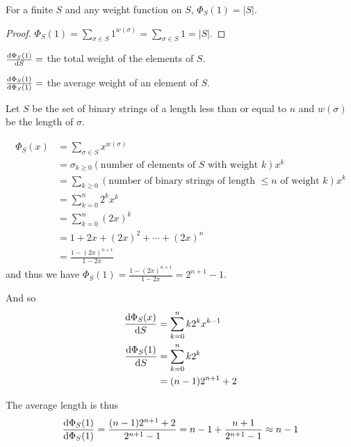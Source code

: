 \documentclass[12pt]{article}
\begin{document}
\begin{theorem}
For a finite $S$ and any weight function on $S$, $\Phi_S(1) = |S|$.
\end{theorem}

\begin{proof}
$\Phi_S(1) = \displaystyle\sum_{\sigma \in S} 1^{w(\sigma)} = \sum_{\sigma \in S} 1 = |S|$.
\end{proof}

\begin{theorem}
$\frac{{\rm d} \Phi_S(1)}{{\rm d} S} =$ the total weight of the elements of $S$.
\end{theorem}

\begin{theorem}
$\frac{{\rm d} \Phi_S(1)}{{\rm d} \Phi_S(1)} =$ the average weight of an element of $S$.
\end{theorem}

\begin{example}
Let $S$ be the set of binary strings of a length less than or equal to $n$ and $w(\sigma)$ be the length of $\sigma$.

\begin{align*}
\Phi_S(x) &= \sum_{\sigma \in S} x^{w(\sigma)}\\
&= \sigma_{k \geq 0} (\text{number of elements of }S\text{ with weight }k) x^k\\
&= \sum_{k \geq 0} (\text{number of binary strings of length }\leq n\text{ of weight }k) x^k\\
&= \sum_{k=0}^n 2^k x^k\\
&= \sum_{k=0}^n {(2x)}^k\\
&= 1 + 2x + {(2x)}^2 + \cdots + {(2x)}^n\\
&= \frac{1 - {(2x)}^{n+1}}{1 - 2x}
\end{align*}
and thus we have $\Phi_S(1) = \frac{1 - {(2x)}^{n+1}}{1 - 2x} = 2^{n+1} - 1$.

And so
\begin{align*}
\frac{{\rm d} \Phi_S(x)}{{\rm d} S} &= \sum_{k=0}^n k 2^k x^{k-1}\\
\frac{{\rm d} \Phi_S(1)}{{\rm d} S} &= \sum_{k=0}^n k 2^k\\
&= (n-1)2^{n+1} + 2
\end{align*}

The average length is thus \[ \frac{{\rm d} \Phi_S(1)}{{\rm d} \Phi_S(1)} = \frac{(n-1)2^{n+1} + 2}{2^{n+1} - 1} = n - 1 + \frac{n+1}{2^{n+1} - 1} \approx n - 1 \]
\end{example}
\end{document}
